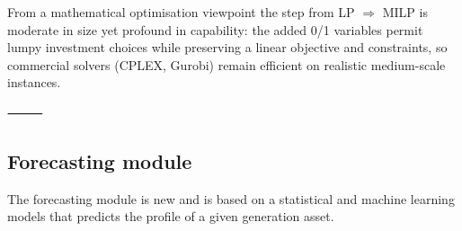 From a mathematical optimisation viewpoint the step from LP $\Rightarrow$ MILP is moderate in size yet profound in capability: the added 0/1 variables permit lumpy investment choices while preserving a linear objective and constraints, so commercial solvers (CPLEX, Gurobi) remain efficient on realistic medium-scale instances.

⸻

\subsection{Forecasting module}
\label{sec:forecasting-module}

The forecasting module is new and is based on a statistical and machine learning models 
that predicts the profile of a given generation asset.






\newpage